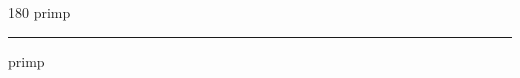 
\begin{frame}
\begin{center}
\begin{turn}{180}
{\fontsize{2.5cm}{1em}\selectfont primp}
\end{turn}
\vspace{1em}\par  
\hrule
\vspace{1em}\par  
{\fontsize{2.5cm}{1em}\selectfont primp}
\end{center}
\end{frame}
